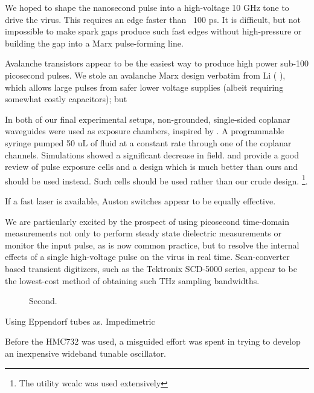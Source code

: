 \documentclass[paper.tex]{subfiles}
\begin{document}
We hoped to shape the nanosecond pulse into a high-voltage 10 GHz tone to drive the virus. This requires an edge faster than ~100 ps. It is difficult, but not impossible\cite{Fundamental1998} to make spark gaps produce such fast edges without high-pressure\cite{Design2007d}\cite{Picosecond1993} or building the gap into a Marx\cite{Simple1991} pulse-forming line. 

Avalanche transistors appear to be the easiest way to produce high power sub-100 picosecond pulses. We stole an avalanche Marx design verbatim from Li (\cite{Development2016b} \cite{Design2018c}), which allows large pulses from safer lower voltage supplies (albeit requiring somewhat costly capacitors); but 

In both of our final experimental setups, non-grounded, single-sided coplanar waveguides were used as exposure chambers, inspired by \cite{Microwave2007}. A programmable syringe pumped 50 uL of fluid at a constant rate through one of the coplanar channels. Simulations showed a significant decrease in field. \cite{Microchamber2011} and \cite{Characterization2012} provide a good review of pulse exposure cells and a design which is much better than ours and should be used instead. Such cells should be used rather than our crude design. \footnote{The utility wcalc was used extensively}.

If a fast laser is available, Auston switches appear to be equally effective.

We are particularly excited by the prospect of using picosecond time-domain measurements not only to perform steady state dielectric measurements or monitor the input pulse, as is now common practice, but to resolve the internal effects of a single high-voltage pulse on the virus in real time. Scan-converter based transient digitizers, such as the Tektronix SCD-5000 series, appear to be the lowest-cost method of obtaining such THz sampling bandwidths. 


\begin{figure}[H]
	\centering

	\caption{Second.}
	\hfill
	
\end{figure}


Using Eppendorf tubes as. Impedimetric 

Before the HMC732 was used, a misguided effort was spent in trying to develop an inexpensive wideband tunable oscillator. 
\end{document}

